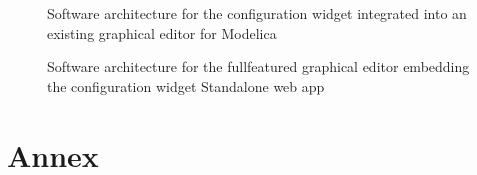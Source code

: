 \documentclass[letterpaper,10pt, openany,english]{sphinxmanual}
\begin{document}
\begin{figure}[htbp]
\centering
\capstart

\noindent{}
\caption{Software architecture for the configuration widget integrated into an existing graphical editor for Modelica}\label{\detokenize{architecture:linkage-architecture-plugin}}\end{figure}

\begin{figure}[htbp]
\centering
\capstart

\noindent{}
\caption{Software architecture for the full\sphinxhyphen{}featured graphical editor embedding the configuration widget \sphinxhyphen{} Standalone web app}\label{\detokenize{architecture:linkage-architecture-spa}}\end{figure}


\chapter{Annex}
\label{\detokenize{annex:annex}}\label{\detokenize{annex:sec-annex}}\label{\detokenize{annex::doc}}
\end{document}
